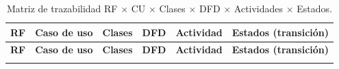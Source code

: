 \documentclass[11pt,a4paper]{article}
\renewcommand{\_}{\textunderscore\allowbreak}
\begin{document}
\begin{landscape}
\renewcommand{\arraystretch}{1.2}

\begin{longtable}{|p{1.2cm}|p{4.0cm}|p{4.6cm}|p{1.6cm}|p{3.9cm}|p{4.2cm}|}
\caption{Matriz de trazabilidad RF $\times$ CU $\times$ Clases $\times$ DFD $\times$ Actividades $\times$ Estados.}
\label{tab:trazabilidad}\\
\hline
\textbf{RF} & \textbf{Caso de uso} & \textbf{Clases} & \textbf{DFD} & \textbf{Actividad} & \textbf{Estados (transición)}\\
\hline
\endfirsthead

\hline
\textbf{RF} & \textbf{Caso de uso} & \textbf{Clases} & \textbf{DFD} & \textbf{Actividad} & \textbf{Estados (transición)}\\
\hline
\endhead

\hline
\endfoot

\hline
\endlastfoot


\end{longtable}
\end{landscape}
\end{document}
